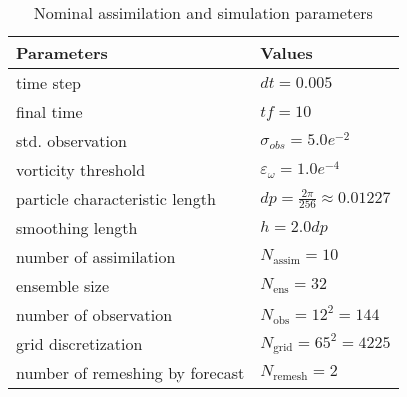 \begin{table}[htbp]
    \centering
    \caption{Nominal assimilation and simulation parameters}
    \begin{tabular}{|l|l|}
        \hline
        Parameters                      & Values                                   \\
        \hline
        time step                       & $dt = 0.005$                             \\
        final time                      & $tf =10$                                 \\
        std. observation                & $\sigma_{obs} =  5.0e^{-2}$              \\
        vorticity threshold             & $\varepsilon_{\omega} = 1.0e^{-4}$       \\
        particle characteristic length  & $dp = \frac{2\pi}{256} \approx 0.01227 $ \\
        smoothing length                & $h = 2.0 dp$                             \\
        number of assimilation          & $N_{\text{assim}} = 10$                  \\
        ensemble size                   & $N_{\text{ens}} = 32$                    \\
        number of observation           & $N_{\text{obs}} = 12^2 = 144$            \\
        grid discretization             & $N_{\text{grid}} = 65^2 = 4225$          \\
        number of remeshing by forecast & $N_{\text{remesh}} =  2 $                \\
        \hline
    \end{tabular}
    \label{tab:simu_2d}
\end{table}
